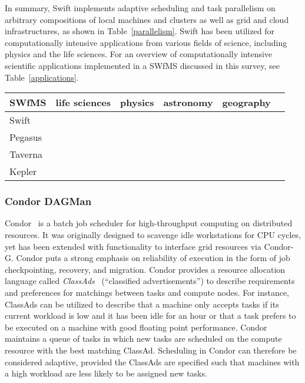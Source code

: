 In summary, Swift implements adaptive scheduling and task parallelism on arbitrary compositions of local machines and clusters as well as grid and cloud infrastructures, as shown in Table~\ref{parallelism}. Swift has been utilized for computationally intensive applications from various fields of science, including physics and the life sciences. For an overview of computationally intensive scientific applications implemented in a SWfMS discussed in this survey, see Table~\ref{applications}.

\begin{table*}[hbtp]
	\caption[Scientific applications implemented SWfMS]{Scientific applications implemented in a SWfMS}\label{applications}
\medskip
\centering
	\begin{tabular}{llllll}
		\toprule
		SWfMS&life sciences&physics&astronomy&geography\\
		\midrule
		Swift&\citep{Stef-Praun2007,Hasson2008,DeBartolo2010,Lee2010,Adhikari2012}&&&\citep{Agarwal2011,Woitaszek2011}\\
		Pegasus&\citep{Wang2011,Mehta2011}&\citep{Brown2006}&\citep{Berriman2004}&\citep{Deelman2006}\\
		Taverna&\citep{Kell2009,Maleki-Dizaji2009,Zhou2009}&&&\\
		Kepler&\citep{Michener2007}&\citep{Podhorszki2007}&&\citep{Barseghian2010}\\
		\bottomrule
	\end{tabular}
\end{table*}

\subsubsection{Condor DAGMan}
Condor~\citep{Litzkow88} is a batch job scheduler for high-throughput computing on distributed resources. It was originally designed to scavenge idle workstations for CPU cycles, yet has been extended with functionality to interface grid resources via Condor-G. Condor puts a strong emphasis on reliability of execution in the form of job checkpointing, recovery, and migration. Condor provides a resource allocation language called \textit{ClassAds}~\citep{Thain2005} (``classified advertisements'') to describe requirements and preferences for matchings between tasks and compute nodes. For instance, ClassAds can be utilized to describe that a machine only accepts tasks if its current workload is low and it has been idle for an hour or that a task prefers to be executed on a machine with good floating point performance. Condor maintains a queue of tasks in which new tasks are scheduled on the compute resource with the best matching ClassAd. Scheduling in Condor can therefore be considered adaptive, provided the ClassAds are specified such that machines with a high workload are less likely to be assigned new tasks.


